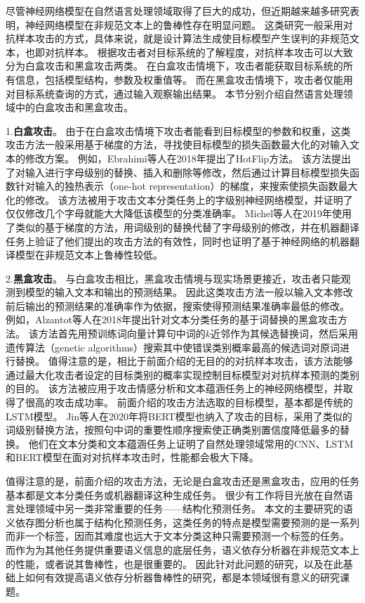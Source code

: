 尽管神经网络模型在自然语言处理领域取得了巨大的成功，但近期越来越多研究表明，神经网络模型在非规范文本上的鲁棒性存在明显问题。
这类研究一般采用对抗样本攻击的方式，具体来说，就是设计算法生成使目标模型产生误判的非规范文本，也即对抗样本。
根据攻击者对目标系统的了解程度，对抗样本攻击可以大致分为白盒攻击和黑盒攻击两类。
在白盒攻击情境下，攻击者能获取目标系统的所有信息，包括模型结构，参数及权重值等。
而在黑盒攻击情境下，攻击者仅能用对目标系统查询的方式，通过输入观察输出结果。
本节分别介绍自然语言处理领域中的白盒攻击和黑盒攻击。

1.\textbf{白盒攻击}。
由于在白盒攻击情境下攻击者能看到目标模型的参数和权重，这类攻击方法一般采用基于梯度的方法，寻找使目标模型的损失函数最大化的对输入文本的修改方案。
例如，Ebrahimi等人在2018年提出了HotFlip方法。\cite{ebrahimi-etal-2018-hotflip}
该方法提出了对输入进行字母级别的替换、插入和删除等修改，然后通过计算目标模型损失函数针对输入的独热表示（one-hot representation）的梯度，来搜索使损失函数最大化的修改。
该方法被用于攻击文本分类任务上的字级别神经网络模型，并证明了仅仅修改几个字母就能大大降低该模型的分类准确率。
Michel等人在2019年使用了类似的基于梯度的方法\cite{michel-etal-2019-evaluation}，用词级别的替换代替了字母级别的修改，并在机器翻译任务上验证了他们提出的攻击方法的有效性，同时也证明了基于神经网络的机器翻译模型在非规范文本上鲁棒性较低。


2.\textbf{黑盒攻击}。
与白盒攻击相比，黑盒攻击情境与现实场景更接近，攻击者只能观测到模型的输入文本和输出的预测结果。
因此这类攻击方法一般以输入文本修改前后输出的预测结果的准确率作为依据，搜索使得预测结果准确率最低的修改。
例如，Alzantot等人在2018年提出针对文本分类任务的基于词替换的黑盒攻击方法\cite{alzantot-etal-2018-generating}。
该方法首先用预训练词向量计算句中词的$k$近邻作为其候选替换词，然后采用遗传算法（genetic algorithms）搜索其中使错误类别概率最高的候选词对原词进行替换。
值得注意的是，相比于前面介绍的无目的的对抗样本攻击，该方法能够通过最大化攻击者设定的目标类别的概率实现控制目标模型对对抗样本预测的类别的目的。
该方法被应用于攻击情感分析和文本蕴涵任务上的神经网络模型，并取得了很高的攻击成功率。
前面介绍的攻击方法选取的目标模型，基本都是传统的LSTM模型。
Jin等人在2020年将BERT模型也纳入了攻击的目标\cite{jin-etal-2020-isbert}，采用了类似的词级别替换方法，按照句中词的重要性顺序搜索使正确类别置信度降低最多的替换。
他们在文本分类和文本蕴涵任务上证明了自然处理领域常用的CNN、LSTM和BERT模型在面对对抗样本攻击时，性能都会极大下降。

值得注意的是，前面介绍的攻击方法，无论是白盒攻击还是黑盒攻击，应用的任务基本都是文本分类任务或机器翻译这种生成任务。
很少有工作将目光放在自然语言处理领域中另一类非常重要的任务——结构化预测任务。
本文的主要研究的语义依存图分析也属于结构化预测任务，这类任务的特点是模型需要预测的是一系列而非一个标签，因而其难度也远大于文本分类这种只需要预测一个标签的任务。
而作为为其他任务提供重要语义信息的底层任务，语义依存分析器在非规范文本上的性能，或者说其鲁棒性，也是很重要的。
因此针对此问题的研究，以及在此基础上如何有效提高语义依存分析器鲁棒性的研究，都是本领域很有意义的研究课题。

